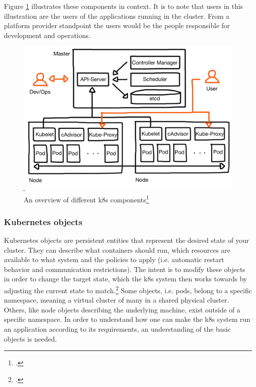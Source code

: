 Figure \ref{fig:k8s-big-picture} illustrates these components in context. It is to note that users in this illustration are the users of the applications running in the cluster. From a platform provider standpoint the users would be the people responsible for development and operations.

\begin{figure}[H]
\includegraphics[scale=0.2]{pictures/big-picture.JPG} 
\caption{An overview of different \gls{k8s} components\protect\footcite{nicoPictures}}
\label{fig:k8s-big-picture}
\end{figure}


\subsubsection{Kubernetes objects}
Kubernetes objects are persistent entities that represent the desired state of your cluster. They can describe what containers should run, which resources are available to what system and the policies to apply (i.e. automatic restart behavior and communication restrictions).
The intent is to modify these objects in order to change the target state, which the \gls{k8s} system then works towards by adjusting the current state to match.\footcite[][, section 'Understanding Kubernetes Objects']{k8sObjects}
Some objects, i.e. pods, belong to a specific namespace, meaning a virtual cluster of many in a shared physical cluster. Others, like node objects describing the underlying machine, exist outside of a specific namespace.
In order to understand how one can make the \gls{k8s} system run an application according to its requirements, an understanding of the basic objects is needed.

